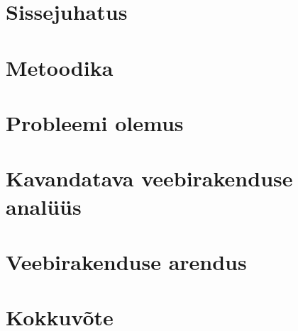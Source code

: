 \chapter{Sissejuhatus}\label{chapter:introduction}


\chapter{Metoodika}\label{chapter:metodology}


\chapter{Probleemi olemus}\label{chapter:problem_statement}


\chapter{Kavandatava veebirakenduse analüüs}\label{chapter:analysis}


\chapter{Veebirakenduse arendus}\label{chapter:development}



\chapter{Kokkuvõte}\label{chapter:summary} 

